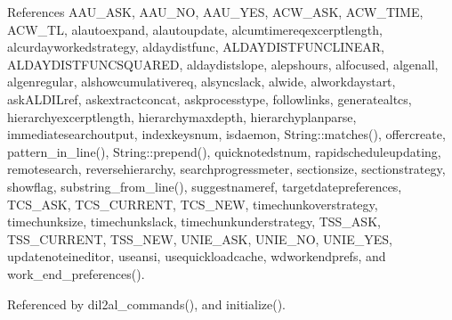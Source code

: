 References AAU\_\-ASK, AAU\_\-NO, AAU\_\-YES, ACW\_\-ASK, ACW\_\-TIME, ACW\_\-TL, alautoexpand, alautoupdate, alcumtimereqexcerptlength, alcurdayworkedstrategy, aldaydistfunc, ALDAYDISTFUNCLINEAR, ALDAYDISTFUNCSQUARED, aldaydistslope, alepshours, alfocused, algenall, algenregular, alshowcumulativereq, alsyncslack, alwide, alworkdaystart, ask\-ALDILref, askextractconcat, askprocesstype, followlinks, generatealtcs, hierarchyexcerptlength, hierarchymaxdepth, hierarchyplanparse, immediatesearchoutput, indexkeysnum, isdaemon, String::matches(), offercreate, pattern\_\-in\_\-line(), String::prepend(), quicknotedstnum, rapidscheduleupdating, remotesearch, reversehierarchy, searchprogressmeter, sectionsize, sectionstrategy, showflag, substring\_\-from\_\-line(), suggestnameref, targetdatepreferences, TCS\_\-ASK, TCS\_\-CURRENT, TCS\_\-NEW, timechunkoverstrategy, timechunksize, timechunkslack, timechunkunderstrategy, TSS\_\-ASK, TSS\_\-CURRENT, TSS\_\-NEW, UNIE\_\-ASK, UNIE\_\-NO, UNIE\_\-YES, updatenoteineditor, useansi, usequickloadcache, wdworkendprefs, and work\_\-end\_\-preferences().

Referenced by dil2al\_\-commands(), and initialize().



